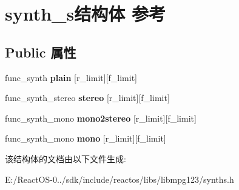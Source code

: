 \hypertarget{structsynth__s}{}\section{synth\+\_\+s结构体 参考}
\label{structsynth__s}
\subsection*{Public 属性}
\begin{DoxyCompactItemize}
\item 
\mbox{\label{structsynth__s_ab4208cef11f35485426fc28ae9155c6b}} 
func\+\_\+synth {\bfseries plain} \mbox{[}r\+\_\+limit\mbox{]}\mbox{[}f\+\_\+limit\mbox{]}
\item 
\mbox{\label{structsynth__s_abefa291e78c4b74c1d9a6a91f3a86f8c}} 
func\+\_\+synth\+\_\+stereo {\bfseries stereo} \mbox{[}r\+\_\+limit\mbox{]}\mbox{[}f\+\_\+limit\mbox{]}
\item 
\mbox{\label{structsynth__s_a19b1bc18d0ca26d66a15fce14703ed0c}} 
func\+\_\+synth\+\_\+mono {\bfseries mono2stereo} \mbox{[}r\+\_\+limit\mbox{]}\mbox{[}f\+\_\+limit\mbox{]}
\item 
\mbox{\label{structsynth__s_a16d9685840c91611389ead89320c118b}} 
func\+\_\+synth\+\_\+mono {\bfseries mono} \mbox{[}r\+\_\+limit\mbox{]}\mbox{[}f\+\_\+limit\mbox{]}
\end{DoxyCompactItemize}


该结构体的文档由以下文件生成\+:\begin{DoxyCompactItemize}
\item 
E\+:/\+React\+O\+S-\/0../sdk/include/reactos/libs/libmpg123/synths.\+h\end{DoxyCompactItemize}

